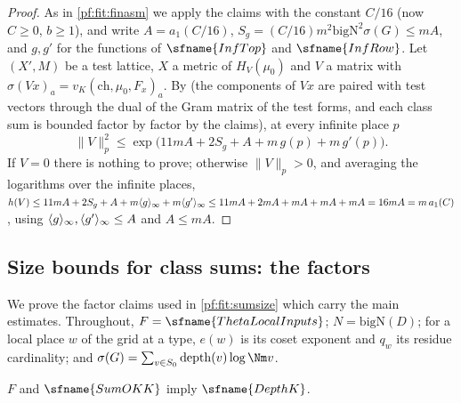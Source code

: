 \begin{proof}
As in \cref{pf:fit:finasm} we apply the claims with the constant $C/16$ (now $C\ge0$, $b\ge1$), and write $A=a_1(C/16)$,
$S_g=(C/16)m^2\mathrm{bigN}^2\sigma(G)\le mA$, and $g,g'$ for the functions of $\sfname{InfTop}$ and $\sfname{InfRow}$. Let
$(X',M)$ be a test lattice, $X$ a metric of $H_V(\mu_0)$ and $V$ a matrix with $\sigma(Vx)_a=v_K(\mathrm{ch},\mu_0,F_x)_a$. By
 (the components of $Vx$ are paired with test
vectors through the dual of the Gram matrix of the test forms, and each class sum is bounded factor by factor by the claims), at
every infinite place $p$
\[
\|V\|_p^2\le\exp\bigl(11mA+2S_g+A+m\,g(p)+m\,g'(p)\bigr).
\]
If $V=0$ there is nothing to prove; otherwise $\|V\|_p>0$, and averaging the logarithms over the infinite places,
$h(V)\le11mA+2S_g+A+m\langle g\rangle_{\infty}+m\langle g'\rangle_{\infty}\le11mA+2mA+mA+mA+mA=16mA=m\,a_1(C)$, using $\langle g\rangle_{\infty},\langle g'\rangle_{\infty}\le A$ and $A\le mA$.
\end{proof}

\subsection{Size bounds for class sums: the factors}\label{sec:pf:fit:factors}

We prove the factor claims used in \cref{pf:fit:sumsize} which carry the main estimates. Throughout, $F=\sfname{ThetaLocalInputs}$;
$N=\mathrm{bigN}(D)$; for a local place $w$ of the grid at a type, $e(w)$ is its coset exponent and $q_w$ its residue
cardinality; and $\sigma(G)=\sum_{v\in S_0}\mathrm{depth}(v)\log\Nm v$.

\begin{theorem}\label{pf:fit:depth}
$F$ and $\sfname{SumOKK}$ imply $\sfname{DepthK}$.
\end{theorem}

